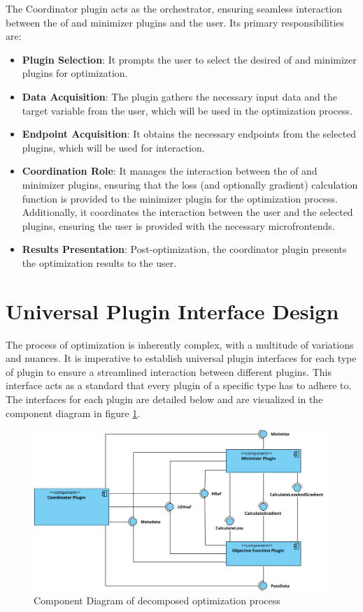 \documentclass[
  a4paper,  %
  twoside,  %
  bibliography=totoc,
  headsepline,
  cleardoublepage=empty,
  parskip=half,
  draft=false
]{scrbook}
\begin{document}
The Coordinator plugin acts as the orchestrator, ensuring seamless interaction between the \gls{of} and minimizer plugins and the user.
Its primary responsibilities are:

\begin{itemize}
\item \textbf{Plugin Selection}: It prompts the user to select the desired \gls{of} and minimizer plugins for optimization.
\item \textbf{Data Acquisition}: The plugin gathers the necessary input data and the target variable from the user, which will be used in the optimization process.
\item \textbf{Endpoint Acquisition}: It obtains the necessary endpoints from the selected plugins, which will be used for interaction.
\item \textbf{Coordination Role}: It manages the interaction between the \gls{of} and minimizer plugins, ensuring that the loss (and optionally gradient) calculation function is provided to the minimizer plugin for the optimization process.
Additionally, it coordinates the interaction between the user and the selected plugins, ensuring the user is provided with the necessary microfrontends.
\item \textbf{Results Presentation}: Post-optimization, the coordinator plugin presents the optimization results to the user.
\end{itemize}


\section{Universal Plugin Interface Design}

The process of optimization is inherently complex, with a multitude of variations and nuances.
It is imperative to establish universal plugin interfaces for each type of plugin to ensure a streamlined interaction between different plugins.
This interface acts as a standard that every plugin of a specific type has to adhere to.
The interfaces for each plugin are detailed below and are visualized in the component diagram in figure \ref{fig:component_diagram}.

\begin{figure}[ht]
    \centering
    \includegraphics[width=\textwidth]{graphics/plugin_decomposition.svg}
    \caption{Component Diagram of decomposed optimization process}
    \label{fig:component_diagram}
\end{figure}
\end{document}
